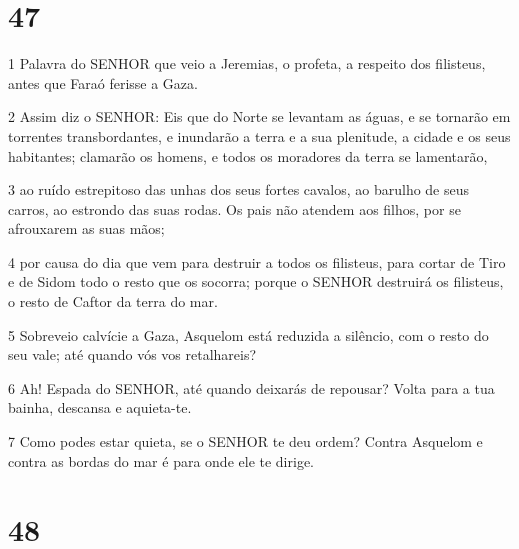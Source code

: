 \chapter{47}

\par 1 Palavra do SENHOR que veio a Jeremias, o profeta, a respeito dos filisteus, antes que Faraó ferisse a Gaza.
\par 2 Assim diz o SENHOR: Eis que do Norte se levantam as águas, e se tornarão em torrentes transbordantes, e inundarão a terra e a sua plenitude, a cidade e os seus habitantes; clamarão os homens, e todos os moradores da terra se lamentarão,
\par 3 ao ruído estrepitoso das unhas dos seus fortes cavalos, ao barulho de seus carros, ao estrondo das suas rodas. Os pais não atendem aos filhos, por se afrouxarem as suas mãos;
\par 4 por causa do dia que vem para destruir a todos os filisteus, para cortar de Tiro e de Sidom todo o resto que os socorra; porque o SENHOR destruirá os filisteus, o resto de Caftor da terra do mar.
\par 5 Sobreveio calvície a Gaza, Asquelom está reduzida a silêncio, com o resto do seu vale; até quando vós vos retalhareis?
\par 6 Ah! Espada do SENHOR, até quando deixarás de repousar? Volta para a tua bainha, descansa e aquieta-te.
\par 7 Como podes estar quieta, se o SENHOR te deu ordem? Contra Asquelom e contra as bordas do mar é para onde ele te dirige.

\chapter{48}

